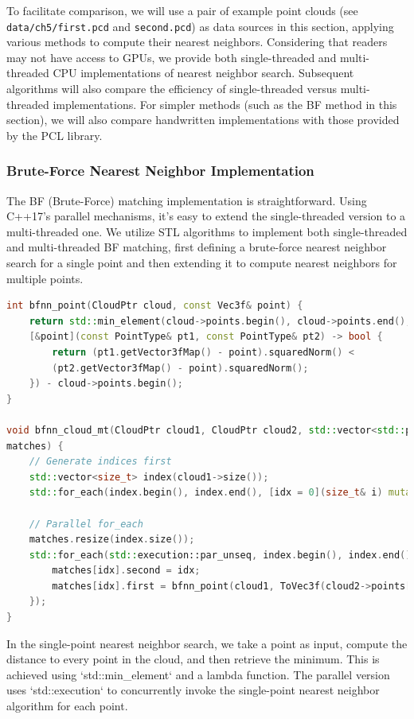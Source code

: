 To facilitate comparison, we will use a pair of example point clouds (see \texttt{data/ch5/first.pcd} and \texttt{second.pcd}) as data sources in this section, applying various methods to compute their nearest neighbors. Considering that readers may not have access to GPUs, we provide both single-threaded and multi-threaded CPU implementations of nearest neighbor search. Subsequent algorithms will also compare the efficiency of single-threaded versus multi-threaded implementations. For simpler methods (such as the BF method in this section), we will also compare handwritten implementations with those provided by the PCL library.

\subsubsection{Brute-Force Nearest Neighbor Implementation}
The BF (Brute-Force) matching implementation is straightforward. Using C++17's parallel mechanisms, it's easy to extend the single-threaded version to a multi-threaded one. We utilize STL algorithms to implement both single-threaded and multi-threaded BF matching, first defining a brute-force nearest neighbor search for a single point and then extending it to compute nearest neighbors for multiple points.

\begin{lstlisting}[language=c++, caption=src/ch5/bfnn.cc]
int bfnn_point(CloudPtr cloud, const Vec3f& point) {
	return std::min_element(cloud->points.begin(), cloud->points.end(),
	[&point](const PointType& pt1, const PointType& pt2) -> bool {
		return (pt1.getVector3fMap() - point).squaredNorm() <
		(pt2.getVector3fMap() - point).squaredNorm();
	}) - cloud->points.begin();
}

void bfnn_cloud_mt(CloudPtr cloud1, CloudPtr cloud2, std::vector<std::pair<size_t, size_t>>& 
matches) {
	// Generate indices first
	std::vector<size_t> index(cloud1->size());
	std::for_each(index.begin(), index.end(), [idx = 0](size_t& i) mutable { i = idx++; });
	
	// Parallel for_each
	matches.resize(index.size());
	std::for_each(std::execution::par_unseq, index.begin(), index.end(), [&](auto idx) {
		matches[idx].second = idx;
		matches[idx].first = bfnn_point(cloud1, ToVec3f(cloud2->points[idx]));
	});
}
\end{lstlisting}

In the single-point nearest neighbor search, we take a point as input, compute the distance to every point in the cloud, and then retrieve the minimum. This is achieved using `std::min_element` and a lambda function. The parallel version uses `std::execution` to concurrently invoke the single-point nearest neighbor algorithm for each point.

